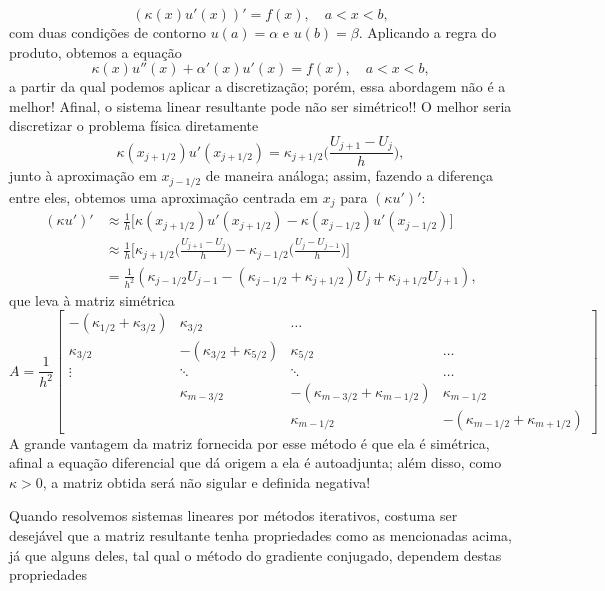 \documentclass[../differential_methods.tex]{subfiles}
\begin{document}
\[
	(\kappa (x)u'(x))'=f(x),\quad a <x < b,
\]
com duas condições de contorno \(u(a)=\alpha \) e \(u(b)=\beta \). Aplicando a regra do produto, obtemos a equação
\[
	\kappa (x)u''(x)+\alpha '(x)u'(x)=f(x),\quad a<x<b,
\]
a partir da qual podemos aplicar a discretização; porém, essa abordagem não é a melhor! Afinal, o sistema linear resultante pode não ser simétrico!!
O melhor seria discretizar o problema física diretamente
\[
	\kappa (x_{j+1/2})u'(x_{j+1/2})=\kappa_{j+1/2}\biggl(\frac{U_{j+1}-U_{j}}{h}\biggr),
\]
junto à aproximação em \(x_{j-1/2}\) de maneira análoga; assim, fazendo a diferença entre eles, obtemos uma aproximação centrada em \(x_{j}\) para \((\kappa u')'\):
\begin{align*}
	(\kappa u')' & \approx \frac{1}{h}\biggl[\kappa (x_{j+1/2})u'(x_{j+1/2}) - \kappa (x_{j-1/2})u'(x_{j-1/2})\biggr]                                        \\
	             & \approx \frac{1}{h}\biggl[\kappa _{j+1/2}\biggl(\frac{U_{j+1}-U_{j}}{h}\biggr)-\kappa_{j-1/2}\biggl(\frac{U_{j}-U_{j-1}}{h}\biggr)\biggr] \\
	             & = \frac{1}{h^{2}}(\kappa_{j-1/2}U_{j-1}-(\kappa_{j-1/2}+\kappa_{j+1/2})U_{j}+\kappa_{j+1/2}U_{j+1}),
\end{align*}
que leva à matriz simétrica
\[
	A=\frac{1}{h^{2}}\begin{bmatrix}
		-(\kappa_{1/2}+\kappa_{3/2}) & \kappa_{3/2}                 & \dotsc                             &                                  \\
		\kappa_{3/2}                 & -(\kappa_{3/2}+\kappa_{5/2}) & \kappa_{5/2}                       & \dotsc                           \\
		\vdots                       & \ddots                       & \ddots                             & \dotsc                           \\
		                             & \kappa_{m-3/2}               & -(\kappa_{m-3/2} + \kappa_{m-1/2}) & \kappa_{m-1/2}                   \\
		                             &                              & \kappa_{m-1/2}                     & -(\kappa_{m-1/2}+\kappa_{m+1/2})
	\end{bmatrix}
\]
A grande vantagem da matriz fornecida por esse método é que ela é simétrica, afinal a equação diferencial que dá origem a ela é autoadjunta; além disso, como \(\kappa >0\), a matriz obtida será não sigular e definida negativa!

Quando resolvemos sistemas lineares por métodos iterativos, costuma ser desejável que a matriz resultante tenha propriedades como as mencionadas acima, já que alguns deles, tal qual o método do gradiente conjugado, dependem destas propriedades
\end{document}
